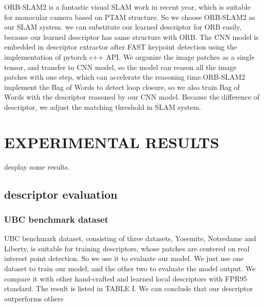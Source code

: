 \documentclass[letterpaper, 10 pt, conference]{ieeeconf}  %
\begin{document}
ORB-SLAM2 is a fantastic visual SLAM work in recent year, which is suitable for monocular camera based on PTAM structure. So we choose ORB-SLAM2 as our SLAM system. we can substitute our learned descriptor for ORB easily, because our learned descriptor has same structure with ORB. The CNN model is embedded in descriptor extractor after FAST keypoint detection using the implementation of pytorch c++ API. We organize the image patches as a single tensor, and transfer to CNN model, so the model can reason all the image patches with one step, which can accelerate the reasoning time.ORB-SLAM2 implement the Bag of Words to detect loop closure, so we also train Bag of Words with the descriptor reasoned by our CNN model. Because the difference of descriptor, we adjust the matching threshold in SLAM system.

\section{EXPERIMENTAL RESULTS}
desplay some results.

\subsection{descriptor evaluation}

\subsubsection{UBC benchmark dataset}
UBC benchmark dataset, consisting of three datasets, Yosemite, Notredame and Liberty, is suitable for training descriptors, whose patches are centered on real interest point detection. So we use it to evaluate our model. We just use one dataset to train our model, and the other two to evaluate the model output. We compare it with other hand-crafted and learned local descriptors with FPR95 standard. The result is listed in TABLE I. We can conclude that our descriptor outperforms others
\end{document}

